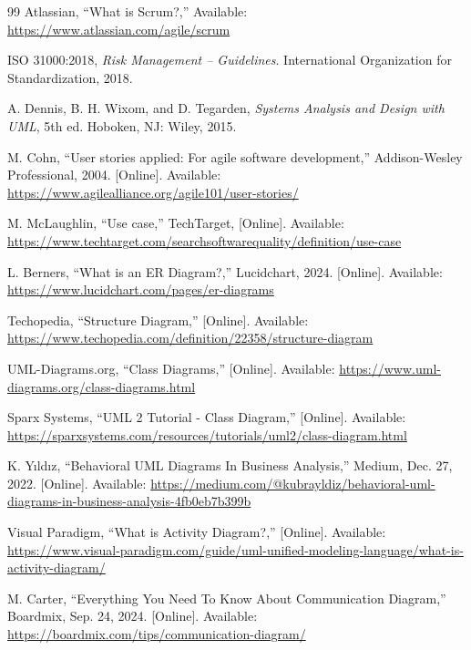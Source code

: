 \begin{thebibliography}{99}
 Atlassian, ``What is Scrum?,'' Available: \url{https://www.atlassian.com/agile/scrum}

 ISO 31000:2018, \textit{Risk Management -- Guidelines}. International Organization for Standardization, 2018.

 A. Dennis, B. H. Wixom, and D. Tegarden, \textit{Systems Analysis and Design with UML}, 5th ed. Hoboken, NJ: Wiley, 2015.

 M. Cohn, ``User stories applied: For agile software development,'' Addison-Wesley Professional, 2004. [Online]. Available: \url{https://www.agilealliance.org/agile101/user-stories/}

 M. McLaughlin, ``Use case,'' TechTarget, [Online]. Available: \url{https://www.techtarget.com/searchsoftwarequality/definition/use-case}

 L. Berners, ``What is an ER Diagram?,'' Lucidchart, 2024. [Online]. Available: \url{https://www.lucidchart.com/pages/er-diagrams}

 Techopedia, ``Structure Diagram,'' [Online]. Available: \url{https://www.techopedia.com/definition/22358/structure-diagram}

 UML-Diagrams.org, ``Class Diagrams,'' [Online]. Available: \url{https://www.uml-diagrams.org/class-diagrams.html}

 Sparx Systems, ``UML 2 Tutorial - Class Diagram,'' [Online]. Available: \url{https://sparxsystems.com/resources/tutorials/uml2/class-diagram.html}

 K. Yıldız, ``Behavioral UML Diagrams In Business Analysis,'' Medium, Dec. 27, 2022. [Online]. Available: \url{https://medium.com/@kubrayldiz/behavioral-uml-diagrams-in-business-analysis-4fb0eb7b399b}

 Visual Paradigm, ``What is Activity Diagram?,'' [Online]. Available: \url{https://www.visual-paradigm.com/guide/uml-unified-modeling-language/what-is-activity-diagram/}

 M. Carter, ``Everything You Need To Know About Communication Diagram,'' Boardmix, Sep. 24, 2024. [Online]. Available: \url{https://boardmix.com/tips/communication-diagram/}


\end{thebibliography}
